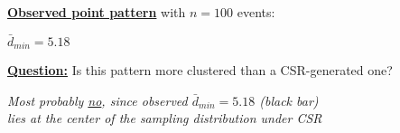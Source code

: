 \documentclass[portrait]{seminar}
\begin{document}
%
%
\begin{slide*}
\begin{center}
 \vspace*{-0.6cm} 
\end{center}
 \vspace{0.2cm}

\underline{\textbf{Observed point pattern}} with $n=100$ events:

\begin{center}
\begin{figure}
\end{figure}
\end{center}
\vspace{-0.4cm} {\small \hspace{3.6cm} $\bar{d}_{min} = 5.18$}

\vspace{0.2cm}\underline{\textbf{Question:}} Is this pattern more
clustered than a CSR-generated one?

\begin{center}
\begin{figure}
\end{figure}
\end{center}

\vspace{-0.2cm}
\begin{center}
\emph{Most probably \underline{no}, since observed
$\bar{d}_{min}=5.18$ (black bar) \\ lies at the center of the
sampling distribution under CSR}
\end{center}

\end{slide*}
\end{document}
